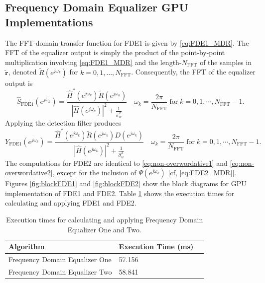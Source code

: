 \subsection{Frequency Domain Equalizer GPU Implementations}
The FFT-domain transfer function for FDE1 is given by \eqref{eq:FDE1_MDR}.
The FFT of the equalizer output is simply the product of the point-by-point multiplication involving
\eqref{eq:FDE1_MDR} and the length-$N_\text{FFT}$ of the samples in $\tilde{\mathbf{r}}$, denoted
$\tilde{R}(e^{j\omega_k})$ for $k=0,1,\ldots,N_\text{FFT}$. 
Consequently, the FFT of the equalizer output is
\begin{equation}
\hat{S}_\text{FDE1}(e^{j\omega_k}) = \frac{\hat{H}^\ast(e^{j\omega_k}) \tilde{R}(e^{j\omega_k})}
  {|\hat{H}(e^{j\omega_k})|^2  +  \frac{1}{\hat{\sigma}^2_w}} \quad
\omega_k = \frac{2\pi}{N_\text{FFT}} \;
\text{for} \;
k=0,1,\cdots,N_\text{FFT}-1.
\label{eq:non-overwordative1}
\end{equation}
Applying the detection filter produces
\begin{equation}
Y_\text{FDE1}(e^{j\omega_k}) = \frac{\hat{H}^\ast(e^{j\omega_k}) \tilde{R}(e^{j\omega_k}) D(e^{j\omega_k})}
  {|\hat{H}(e^{j\omega_k})|^2  +  \frac{1}{\hat{\sigma}^2_w}} \quad
\omega_k = \frac{2\pi}{N_\text{FFT}} \;
\text{for} \;
k=0,1,\cdots,N_\text{FFT}-1.
\label{eq:non-overwordative2}
\end{equation}
The computations for FDE2 are identical to \eqref{eq:non-overwordative1} and \eqref{eq:non-overwordative2},
except for the inclusion of $\Psi(e^{j\omega_k})$ [cf, \eqref{eq:FDE2_MDR}].
Figures \ref{fig:blockFDE1} and \ref{fig:blockFDE2} show the block diagrams for GPU implementation of FDE1 and FDE2.
Table \ref{tab:FDEtimingComparison} shows the execution times for calculating and applying FDE1 and FDE2.
\begin{table}
\captionsetup{width=.8\linewidth}
\caption{Execution times for calculating and applying Frequency Domain Equalizer One and Two.}
\begin{center}
\begin{tabular}{lll}
	\toprule
	Algorithm						& Execution Time (ms)	\\ \midrule
	Frequency Domain Equalizer One 	& 57.156				\\
	Frequency Domain Equalizer Two	& 58.841				\\
	\bottomrule
\end{tabular}
\end{center}
\label{tab:FDEtimingComparison}
\end{table}
